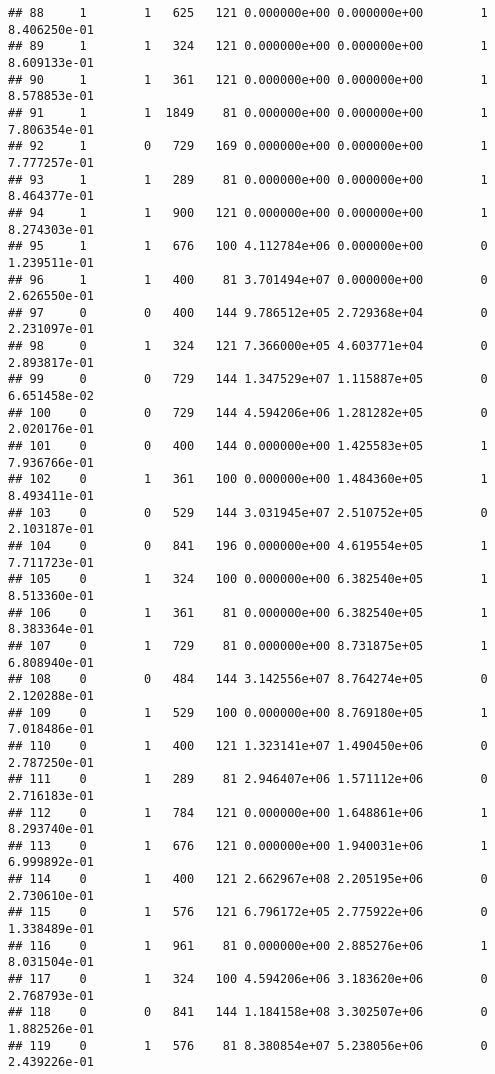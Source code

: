 \documentclass[
]{article}
\begin{document}
\begin{enumerate}
\begin{verbatim}
## 88     1        1   625   121 0.000000e+00 0.000000e+00        1  8.406250e-01
## 89     1        1   324   121 0.000000e+00 0.000000e+00        1  8.609133e-01
## 90     1        1   361   121 0.000000e+00 0.000000e+00        1  8.578853e-01
## 91     1        1  1849    81 0.000000e+00 0.000000e+00        1  7.806354e-01
## 92     1        0   729   169 0.000000e+00 0.000000e+00        1  7.777257e-01
## 93     1        1   289    81 0.000000e+00 0.000000e+00        1  8.464377e-01
## 94     1        1   900   121 0.000000e+00 0.000000e+00        1  8.274303e-01
## 95     1        1   676   100 4.112784e+06 0.000000e+00        0  1.239511e-01
## 96     1        1   400    81 3.701494e+07 0.000000e+00        0  2.626550e-01
## 97     0        0   400   144 9.786512e+05 2.729368e+04        0  2.231097e-01
## 98     0        1   324   121 7.366000e+05 4.603771e+04        0  2.893817e-01
## 99     0        0   729   144 1.347529e+07 1.115887e+05        0  6.651458e-02
## 100    0        0   729   144 4.594206e+06 1.281282e+05        0  2.020176e-01
## 101    0        0   400   144 0.000000e+00 1.425583e+05        1  7.936766e-01
## 102    0        1   361   100 0.000000e+00 1.484360e+05        1  8.493411e-01
## 103    0        0   529   144 3.031945e+07 2.510752e+05        0  2.103187e-01
## 104    0        0   841   196 0.000000e+00 4.619554e+05        1  7.711723e-01
## 105    0        1   324   100 0.000000e+00 6.382540e+05        1  8.513360e-01
## 106    0        1   361    81 0.000000e+00 6.382540e+05        1  8.383364e-01
## 107    0        1   729    81 0.000000e+00 8.731875e+05        1  6.808940e-01
## 108    0        0   484   144 3.142556e+07 8.764274e+05        0  2.120288e-01
## 109    0        1   529   100 0.000000e+00 8.769180e+05        1  7.018486e-01
## 110    0        1   400   121 1.323141e+07 1.490450e+06        0  2.787250e-01
## 111    0        1   289    81 2.946407e+06 1.571112e+06        0  2.716183e-01
## 112    0        1   784   121 0.000000e+00 1.648861e+06        1  8.293740e-01
## 113    0        1   676   121 0.000000e+00 1.940031e+06        1  6.999892e-01
## 114    0        1   400   121 2.662967e+08 2.205195e+06        0  2.730610e-01
## 115    0        1   576   121 6.796172e+05 2.775922e+06        0  1.338489e-01
## 116    0        1   961    81 0.000000e+00 2.885276e+06        1  8.031504e-01
## 117    0        1   324   100 4.594206e+06 3.183620e+06        0  2.768793e-01
## 118    0        0   841   144 1.184158e+08 3.302507e+06        0  1.882526e-01
## 119    0        1   576    81 8.380854e+07 5.238056e+06        0  2.439226e-01

\end{verbatim}
\end{enumerate}
\end{document}
